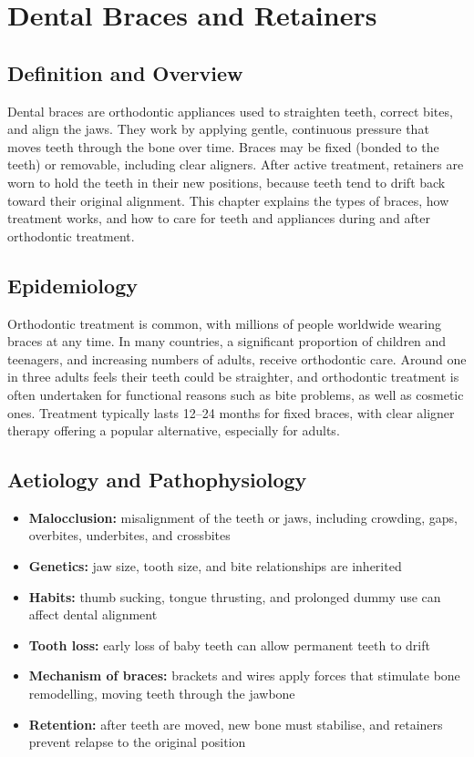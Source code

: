 \chapter{Dental Braces and Retainers}

\section*{Definition and Overview}
Dental braces are orthodontic appliances used to straighten teeth, correct bites, and align the jaws. They work by applying gentle, continuous pressure that moves teeth through the bone over time. Braces may be fixed (bonded to the teeth) or removable, including clear aligners. After active treatment, retainers are worn to hold the teeth in their new positions, because teeth tend to drift back toward their original alignment. This chapter explains the types of braces, how treatment works, and how to care for teeth and appliances during and after orthodontic treatment.

\section*{Epidemiology}
Orthodontic treatment is common, with millions of people worldwide wearing braces at any time. In many countries, a significant proportion of children and teenagers, and increasing numbers of adults, receive orthodontic care. Around one in three adults feels their teeth could be straighter, and orthodontic treatment is often undertaken for functional reasons such as bite problems, as well as cosmetic ones. Treatment typically lasts 12--24 months for fixed braces, with clear aligner therapy offering a popular alternative, especially for adults.

\section*{Aetiology and Pathophysiology}
\begin{itemize}
    \item \textbf{Malocclusion:} misalignment of the teeth or jaws, including crowding, gaps, overbites, underbites, and crossbites
    \item \textbf{Genetics:} jaw size, tooth size, and bite relationships are inherited
    \item \textbf{Habits:} thumb sucking, tongue thrusting, and prolonged dummy use can affect dental alignment
    \item \textbf{Tooth loss:} early loss of baby teeth can allow permanent teeth to drift
    \item \textbf{Mechanism of braces:} brackets and wires apply forces that stimulate bone remodelling, moving teeth through the jawbone
    \item \textbf{Retention:} after teeth are moved, new bone must stabilise, and retainers prevent relapse to the original position
\end{itemize}

